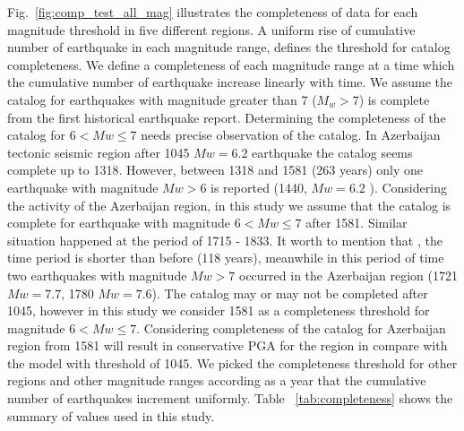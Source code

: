 \noindent
Fig.~\ref{fig:comp_test_all_mag} illustrates the completeness of data for each magnitude threshold in five different regions. A uniform rise of cumulative number of earthquake in each magnitude range, defines the threshold for catalog completeness. We define a completeness of each magnitude range at a time which the cumulative number of earthquake increase linearly with time. We assume the catalog for earthquakes with magnitude greater than  7 ($M_w > 7$) is complete from the first historical earthquake report.  Determining the completeness of the catalog for $ 6 < Mw \leq 7 $ needs precise observation of the catalog. In Azerbaijan tectonic seismic region after 1045  $Mw = 6.2$ earthquake the catalog seems complete up to 1318. However, between 1318 and 1581 (263 years) only one earthquake with magnitude $Mw > 6$ is reported (1440,  $Mw = 6.2$ ). Considering the activity of the Azerbaijan region, in this study we assume that the catalog is complete for earthquake with magnitude $ 6 < Mw \leq 7 $ after 1581. Similar situation happened at the period of 1715 - 1833. It worth to mention that , the time period is shorter than before (118 years), meanwhile in this period of time two earthquakes with magnitude $Mw>7$ occurred in the Azerbaijan region (1721 $Mw=7.7$, 1780 $Mw=7.6$). The catalog may or may not be completed after 1045, however in this study we consider 1581 as a completeness threshold for magnitude  $ 6 < Mw \leq 7 $. Considering completeness of the catalog for Azerbaijan region from 1581 will result in conservative PGA for the region in compare with the model with threshold of 1045. We picked the completeness threshold for other regions and other magnitude ranges according as a year that the cumulative number of earthquakes increment uniformly. Table ~\ref{tab:completeness} shows the summary of values used in this study.



